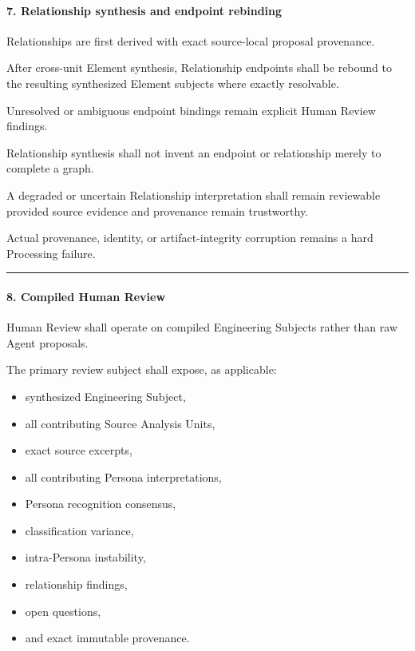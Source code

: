 \hypertarget{7-relationship-synthesis-and-endpoint-rebinding}{%
\paragraph{7. Relationship synthesis and endpoint rebinding}\label{7-relationship-synthesis-and-endpoint-rebinding}}

Relationships are first derived with exact source-local proposal provenance.

After cross-unit Element synthesis, Relationship endpoints shall be rebound to the resulting synthesized Element subjects where exactly resolvable.

Unresolved or ambiguous endpoint bindings remain explicit Human Review findings.

Relationship synthesis shall not invent an endpoint or relationship merely to complete a graph.

A degraded or uncertain Relationship interpretation shall remain reviewable provided source evidence and provenance remain trustworthy.

Actual provenance, identity, or artifact-integrity corruption remains a hard Processing failure.

\begin{center}\rule{0.5\linewidth}{0.5pt}\end{center}

\hypertarget{8-compiled-human-review}{%
\paragraph{8. Compiled Human Review}\label{8-compiled-human-review}}

Human Review shall operate on compiled Engineering Subjects rather than raw Agent proposals.

The primary review subject shall expose, as applicable:

\begin{itemize}
\tightlist
\item
  synthesized Engineering Subject,
\item
  all contributing Source Analysis Units,
\item
  exact source excerpts,
\item
  all contributing Persona interpretations,
\item
  Persona recognition consensus,
\item
  classification variance,
\item
  intra-Persona instability,
\item
  relationship findings,
\item
  open questions,
\item
  and exact immutable provenance.
\end{itemize}

